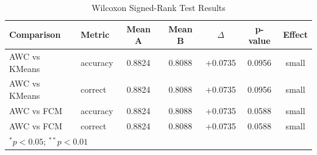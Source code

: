 \begin{table}[ht]
\centering
\caption{Wilcoxon Signed-Rank Test Results}
\label{tab:wilcoxon}
\begin{tabular}{llccccc}
\hline
Comparison & Metric & Mean A & Mean B & $\Delta$ & p-value & Effect \\
\hline
  AWC vs KMeans & accuracy & 0.8824 & 0.8088 & +0.0735 & 0.0956 & small \\
  AWC vs KMeans & correct & 0.8824 & 0.8088 & +0.0735 & 0.0956 & small \\
  AWC vs FCM & accuracy & 0.8824 & 0.8088 & +0.0735 & 0.0588 & small \\
  AWC vs FCM & correct & 0.8824 & 0.8088 & +0.0735 & 0.0588 & small \\
\hline
\multicolumn{7}{l}{$^{*}p<0.05$; $^{**}p<0.01$} \\
\end{tabular}
\end{table}